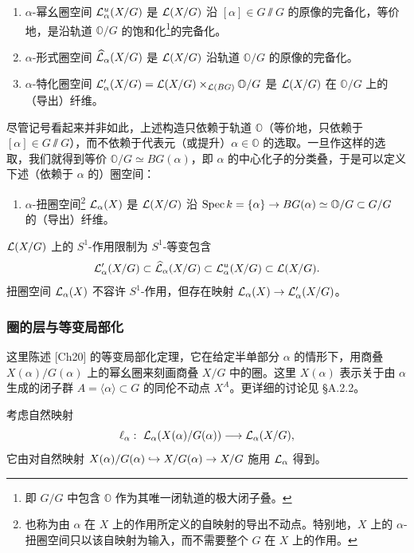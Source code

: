 \begin{enumerate}[label=(\arabic*),leftmargin=2.6em,itemsep=0.2em]
\item $\alpha$-幂幺圈空间 $\mathcal{L}^u_\alpha(X/G)$ 是 $\mathcal{L}(X/G)$ 沿 $[\alpha]\in G\sslash G$ 的原像的完备化，等价地，是沿轨道 $\mathbb O/G$ 的饱和化\footnote{即 $G/G$ 中包含 $\mathbb O$ 作为其唯一闭轨道的极大闭子叠。}的完备化。
\item $\alpha$-形式圈空间 $\widehat{\mathcal{L}}_\alpha(X/G)$ 是 $\mathcal{L}(X/G)$ 沿轨道 $\mathbb O/G$ 的原像的完备化。
\item $\alpha$-特化圈空间 $\mathcal{L}'_\alpha(X/G)=\mathcal{L}(X/G)\times_{\mathcal{L}(BG)}\mathbb O/G$ 是 $\mathcal{L}(X/G)$ 在 $\mathbb O/G$ 上的（导出）纤维。
\end{enumerate}

尽管记号看起来并非如此，上述构造只依赖于轨道 $\mathbb O$（等价地，只依赖于 $[\alpha]\in G\sslash G$），而不依赖于代表元（或提升）$\alpha\in\mathbb O$ 的选取。一旦作这样的选取，我们就得到等价 $\mathbb O/G\simeq BG(\alpha)$，即 $\alpha$ 的中心化子的分类叠，于是可以定义下述（依赖于 $\alpha$ 的）圈空间：

\begin{enumerate}[label=(\arabic*),leftmargin=2.6em,start=4,itemsep=0.2em]
\item $\alpha$-扭圈空间\footnote{也称为由 $\alpha$ 在 $X$ 上的作用所定义的自映射的导出不动点。特别地，$X$ 上的 $\alpha$-扭圈空间只以该自映射为输入，而不需要整个 $G$ 在 $X$ 上的作用。} $\mathcal{L}_\alpha(X)$ 是 $\mathcal{L}(X/G)$ 沿 $\operatorname{Spec} k=\{\alpha\}\to BG(\alpha)\simeq\mathbb O/G\subset G/G$ 的（导出）纤维。
\end{enumerate}

$\mathcal{L}(X/G)$ 上的 $S^1$-作用限制为 $S^1$-等变包含
\[
\mathcal{L}'_\alpha(X/G)\subset\widehat{\mathcal{L}}_\alpha(X/G)\subset\mathcal{L}^u_\alpha(X/G)\subset\mathcal{L}(X/G).
\]
扭圈空间 $\mathcal{L}_\alpha(X)$ 不容许 $S^1$-作用，但存在映射 $\mathcal{L}_\alpha(X)\to\mathcal{L}'_\alpha(X/G)$。

\subsubsection{圈的层与等变局部化}
这里陈述 [Ch20] 的等变局部化定理，它在给定半单部分 $\alpha$ 的情形下，用商叠 $X(\alpha)/G(\alpha)$ 上的幂幺圈来刻画商叠 $X/G$ 中的圈。这里 $X(\alpha)$ 表示关于由 $\alpha$ 生成的闭子群 $A=\langle\alpha\rangle\subset G$ 的同伦不动点 $X^A$。更详细的讨论见 §A.2.2。

考虑自然映射
\[
\ell_\alpha:\ \LL_\alpha(X(\alpha)/G(\alpha))\lra\LL_\alpha(X/G),
\]
它由对自然映射 $X(\alpha)/G(\alpha)\hookrightarrow X/G(\alpha)\to X/G$ 施用 $\mathcal{L}_\alpha$ 得到。

